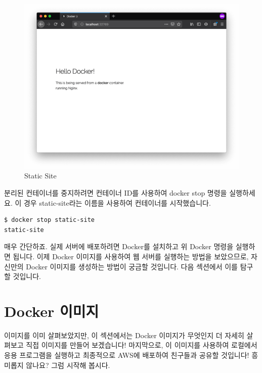 \begin{figure}
\includegraphics[width=\textwidth]{images/static.png}
\caption{Static Site}
\label{fig:static}
\end{figure}


분리된 컨테이너를 중지하려면 컨테이너 ID를 사용하여 docker stop 명령을 실행하세요. 이 경우 static-site라는 이름을 사용하여 컨테이너를 시작했습니다.
\begin{lstlisting}[language=Shell]
$ docker stop static-site
static-site
\end{lstlisting}

매우 간단하죠. 실제 서버에 배포하려면 Docker를 설치하고 위 Docker 명령을 실행하면 됩니다. 이제 Docker 이미지를 사용하여 웹 서버를 실행하는 방법을 보았으므로, 자신만의 Docker 이미지를 생성하는 방법이 궁금할 것입니다. 다음 섹션에서 이를 탐구할 것입니다.

\section{Docker 이미지}
이미지를 이미 살펴보았지만, 이 섹션에서는 Docker 이미지가 무엇인지 더 자세히 살펴보고 직접 이미지를 만들어 보겠습니다! 마지막으로, 이 이미지를 사용하여 로컬에서 응용 프로그램을 실행하고 최종적으로 AWS에 배포하여 친구들과 공유할 것입니다! 흥미롭지 않나요? 그럼 시작해 봅시다.

